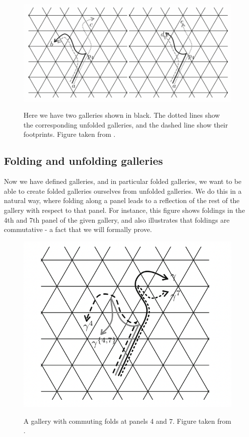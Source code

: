 \documentclass[11pt]{article}
\begin{document}
\begin{figure}[!htbp]
    \begin{center}
    \includegraphics[scale=0.4]{Screenshot 2023-04-18 at 17.30.14.png}\\
    \end{center}
    \caption{Here we have two galleries shown in black. The dotted lines show the corresponding unfolded galleries, and the dashed line show their footprints. Figure taken from \cite[p.129]{SHA}. }
\end{figure}
\subsection{Folding and unfolding galleries}

Now we have defined galleries, and in particular folded galleries, we want to be able to create folded galleries ourselves from unfolded galleries. We do this in a natural way, where folding along a panel leads to a reflection of the rest of the gallery with respect to that panel. For instance, this figure shows foldings in the 4th and 7th panel of the given gallery, and also illustrates that foldings are commutative - a fact that we will formally prove.
\begin{figure}[!htbp]
    \begin{center}
    \includegraphics[scale=0.4]{Screenshot 2023-04-18 at 17.30.24.png}\\
    \end{center}
    \caption{A gallery with commuting folds at panels 4 and 7. Figure taken from \cite[p.132]{SHA}.}
\end{figure}
\end{document}
